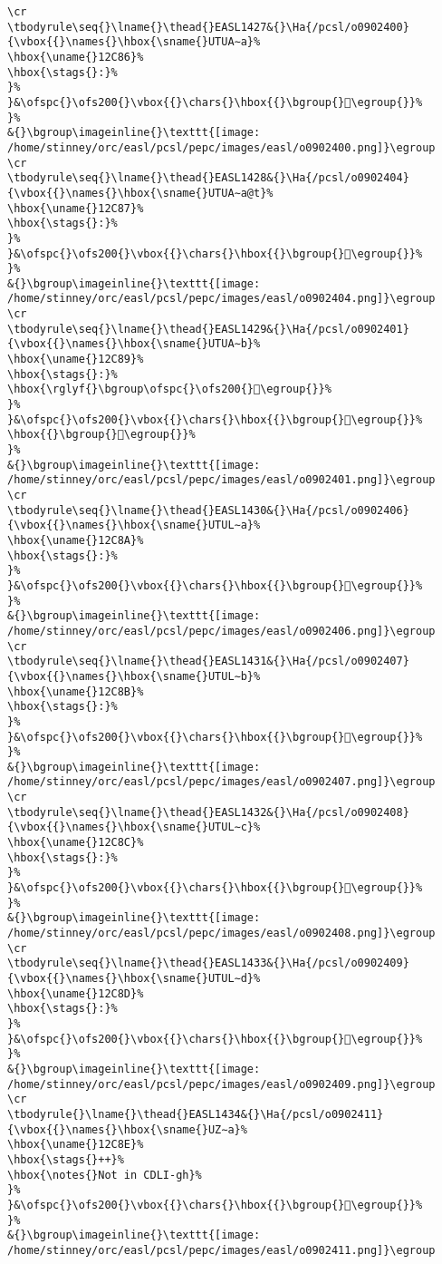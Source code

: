 \begin{verbatim}
\cr
\tbodyrule\seq{}\lname{}\thead{}EASL1427&{}\Ha{/pcsl/o0902400}{\vbox{{}\names{}\hbox{\sname{}UTUA∼a}%
\hbox{\uname{}12C86}%
\hbox{\stags{}:}%
}%
}&\ofspc{}\ofs200{}\vbox{{}\chars{}\hbox{{}\bgroup{}𒲆\egroup{}}%
}%
&{}\bgroup\imageinline{}\texttt{[image: /home/stinney/orc/easl/pcsl/pepc/images/easl/o0902400.png]}\egroup
\cr
\tbodyrule\seq{}\lname{}\thead{}EASL1428&{}\Ha{/pcsl/o0902404}{\vbox{{}\names{}\hbox{\sname{}UTUA∼a@t}%
\hbox{\uname{}12C87}%
\hbox{\stags{}:}%
}%
}&\ofspc{}\ofs200{}\vbox{{}\chars{}\hbox{{}\bgroup{}𒲇\egroup{}}%
}%
&{}\bgroup\imageinline{}\texttt{[image: /home/stinney/orc/easl/pcsl/pepc/images/easl/o0902404.png]}\egroup
\cr
\tbodyrule\seq{}\lname{}\thead{}EASL1429&{}\Ha{/pcsl/o0902401}{\vbox{{}\names{}\hbox{\sname{}UTUA∼b}%
\hbox{\uname{}12C89}%
\hbox{\stags{}:}%
\hbox{\rglyf{}\bgroup\ofspc{}\ofs200{}𒲉\egroup{}}%
}%
}&\ofspc{}\ofs200{}\vbox{{}\chars{}\hbox{{}\bgroup{}𒲈\egroup{}}%
\hbox{{}\bgroup{}𒲉\egroup{}}%
}%
&{}\bgroup\imageinline{}\texttt{[image: /home/stinney/orc/easl/pcsl/pepc/images/easl/o0902401.png]}\egroup
\cr
\tbodyrule\seq{}\lname{}\thead{}EASL1430&{}\Ha{/pcsl/o0902406}{\vbox{{}\names{}\hbox{\sname{}UTUL∼a}%
\hbox{\uname{}12C8A}%
\hbox{\stags{}:}%
}%
}&\ofspc{}\ofs200{}\vbox{{}\chars{}\hbox{{}\bgroup{}𒲊\egroup{}}%
}%
&{}\bgroup\imageinline{}\texttt{[image: /home/stinney/orc/easl/pcsl/pepc/images/easl/o0902406.png]}\egroup
\cr
\tbodyrule\seq{}\lname{}\thead{}EASL1431&{}\Ha{/pcsl/o0902407}{\vbox{{}\names{}\hbox{\sname{}UTUL∼b}%
\hbox{\uname{}12C8B}%
\hbox{\stags{}:}%
}%
}&\ofspc{}\ofs200{}\vbox{{}\chars{}\hbox{{}\bgroup{}𒲋\egroup{}}%
}%
&{}\bgroup\imageinline{}\texttt{[image: /home/stinney/orc/easl/pcsl/pepc/images/easl/o0902407.png]}\egroup
\cr
\tbodyrule\seq{}\lname{}\thead{}EASL1432&{}\Ha{/pcsl/o0902408}{\vbox{{}\names{}\hbox{\sname{}UTUL∼c}%
\hbox{\uname{}12C8C}%
\hbox{\stags{}:}%
}%
}&\ofspc{}\ofs200{}\vbox{{}\chars{}\hbox{{}\bgroup{}𒲌\egroup{}}%
}%
&{}\bgroup\imageinline{}\texttt{[image: /home/stinney/orc/easl/pcsl/pepc/images/easl/o0902408.png]}\egroup
\cr
\tbodyrule\seq{}\lname{}\thead{}EASL1433&{}\Ha{/pcsl/o0902409}{\vbox{{}\names{}\hbox{\sname{}UTUL∼d}%
\hbox{\uname{}12C8D}%
\hbox{\stags{}:}%
}%
}&\ofspc{}\ofs200{}\vbox{{}\chars{}\hbox{{}\bgroup{}𒲍\egroup{}}%
}%
&{}\bgroup\imageinline{}\texttt{[image: /home/stinney/orc/easl/pcsl/pepc/images/easl/o0902409.png]}\egroup
\cr
\tbodyrule{}\lname{}\thead{}EASL1434&{}\Ha{/pcsl/o0902411}{\vbox{{}\names{}\hbox{\sname{}UZ∼a}%
\hbox{\uname{}12C8E}%
\hbox{\stags{}++}%
\hbox{\notes{}Not in CDLI-gh}%
}%
}&\ofspc{}\ofs200{}\vbox{{}\chars{}\hbox{{}\bgroup{}𒲎\egroup{}}%
}%
&{}\bgroup\imageinline{}\texttt{[image: /home/stinney/orc/easl/pcsl/pepc/images/easl/o0902411.png]}\egroup

\end{verbatim}
